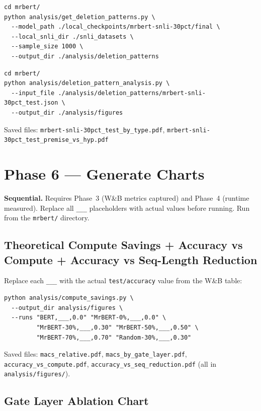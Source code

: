 \documentclass[11pt,a4paper]{article}
\newcommand{\tbd}{\textcolor{placeholder}{\texttt{\_\_\_}}}
\begin{document}
\begin{lstlisting}
cd mrbert/
python analysis/get_deletion_patterns.py \
  --model_path ./local_checkpoints/mrbert-snli-30pct/final \
  --local_snli_dir ./snli_datasets \
  --sample_size 1000 \
  --output_dir ./analysis/deletion_patterns
\end{lstlisting}

\begin{lstlisting}
cd mrbert/
python analysis/deletion_pattern_analysis.py \
  --input_file ./analysis/deletion_patterns/mrbert-snli-30pct_test.json \
  --output_dir ./analysis/figures
\end{lstlisting}

Saved files: \texttt{mrbert-snli-30pct\_test\_by\_type.pdf}, \texttt{mrbert-snli-30pct\_test\_premise\_vs\_hyp.pdf}


\section{Phase 6 --- Generate Charts}
\label{sec:phase6}

\begin{mdframed}[style=notestyle]
\textbf{Sequential.} Requires Phase~3 (W\&B metrics captured) and Phase~4 (runtime measured). Replace all \tbd{} placeholders with actual values before running. Run from the \texttt{mrbert/} directory.
\end{mdframed}

\subsection{Theoretical Compute Savings + Accuracy vs Compute + Accuracy vs Seq-Length Reduction}

Replace each \tbd{} with the actual \texttt{test/accuracy} value from the W\&B table:

\begin{lstlisting}
python analysis/compute_savings.py \
  --output_dir analysis/figures \
  --runs "BERT,___,0.0" "MrBERT-0%,___,0.0" \
         "MrBERT-30%,___,0.30" "MrBERT-50%,___,0.50" \
         "MrBERT-70%,___,0.70" "Random-30%,___,0.30"
\end{lstlisting}

Saved files: \texttt{macs\_relative.pdf}, \texttt{macs\_by\_gate\_layer.pdf}, \texttt{accuracy\_vs\_compute.pdf}, \texttt{accuracy\_vs\_seq\_reduction.pdf} (all in \texttt{analysis/figures/}).

\subsection{Gate Layer Ablation Chart}
\end{document}
